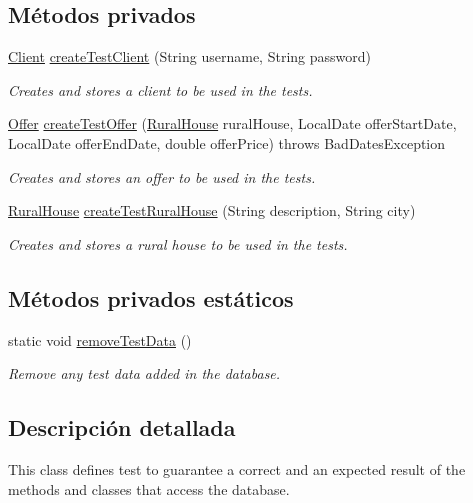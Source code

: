 \subsection*{Métodos privados}
\begin{DoxyCompactItemize}
\item 
\mbox{\hyperlink{a00164}{Client}} \mbox{\hyperlink{a00272_a971c94d6c41317c2cc8de024153f0dc9}{create\+Test\+Client}} (String username, String password)
\begin{DoxyCompactList}\small\item\em Creates and stores a client to be used in the tests. \end{DoxyCompactList}\item 
\mbox{\hyperlink{a00184}{Offer}} \mbox{\hyperlink{a00272_adb47ff6c8ba0fc7e7327407a8c937c4a}{create\+Test\+Offer}} (\mbox{\hyperlink{a00188}{Rural\+House}} rural\+House, Local\+Date offer\+Start\+Date, Local\+Date offer\+End\+Date, double offer\+Price)  throws Bad\+Dates\+Exception 
\begin{DoxyCompactList}\small\item\em Creates and stores an offer to be used in the tests. \end{DoxyCompactList}\item 
\mbox{\hyperlink{a00188}{Rural\+House}} \mbox{\hyperlink{a00272_a455296993315fc3b33f1c5806622ad32}{create\+Test\+Rural\+House}} (String description, String city)
\begin{DoxyCompactList}\small\item\em Creates and stores a rural house to be used in the tests. \end{DoxyCompactList}\end{DoxyCompactItemize}
\subsection*{Métodos privados estáticos}
\begin{DoxyCompactItemize}
\item 
static void \mbox{\hyperlink{a00272_a71fef61bb66234d92d84ddd795de842a}{remove\+Test\+Data}} ()
\begin{DoxyCompactList}\small\item\em Remove any test data added in the database. \end{DoxyCompactList}\end{DoxyCompactItemize}


\subsection{Descripción detallada}
This class defines test to guarantee a correct and an expected result of the methods and classes that access the database. 


